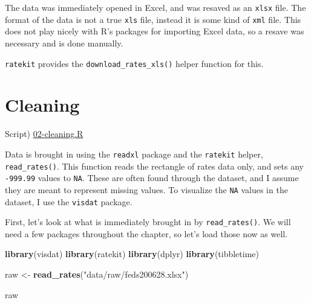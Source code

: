 \documentclass[]{book}
\newenvironment{Shaded}{\begin{snugshade}}{\end{snugshade}}
\newcommand{\KeywordTok}[1]{\textcolor[rgb]{0.13,0.29,0.53}{\textbf{#1}}}
\newcommand{\NormalTok}[1]{#1}
\newcommand{\StringTok}[1]{\textcolor[rgb]{0.31,0.60,0.02}{#1}}
\theoremstyle{definition}
\theoremstyle{definition}
\theoremstyle{definition}
\theoremstyle{remark}
\begin{document}
The data was immediately opened in Excel, and was resaved as an
\texttt{xlsx} file. The format of the data is not a true \texttt{xls}
file, instead it is some kind of \texttt{xml} file. This does not play
nicely with R's packages for importing Excel data, so a resave was
necessary and is done manually.

\texttt{ratekit} provides the \texttt{download\_rates\_xls()} helper
function for this.

\hypertarget{cleaning}{%
\section{Cleaning}\label{cleaning}}

Script) \href{./R/02-cleaning.R}{02-cleaning.R}

Data is brought in using the \texttt{readxl} package and the
\texttt{ratekit} helper, \texttt{read\_rates()}. This function reads the
rectangle of rates data only, and sets any \texttt{-999.99} values to
\texttt{NA}. These are often found through the dataset, and I assume
they are meant to represent missing values. To visualize the \texttt{NA}
values in the dataset, I use the \texttt{visdat} package.

First, let's look at what is immediately brought in by
\texttt{read\_rates()}. We will need a few packages throughout the
chapter, so let's load those now as well.

\begin{Shaded}
\begin{Highlighting}[]
\KeywordTok{library}\NormalTok{(visdat)}
\KeywordTok{library}\NormalTok{(ratekit)}
\KeywordTok{library}\NormalTok{(dplyr)}
\KeywordTok{library}\NormalTok{(tibbletime)}

\NormalTok{raw <-}\StringTok{ }\KeywordTok{read_rates}\NormalTok{(}\StringTok{"data/raw/feds200628.xlsx"}\NormalTok{)}

\NormalTok{raw}
\end{Highlighting}
\end{Shaded}
\end{document}
